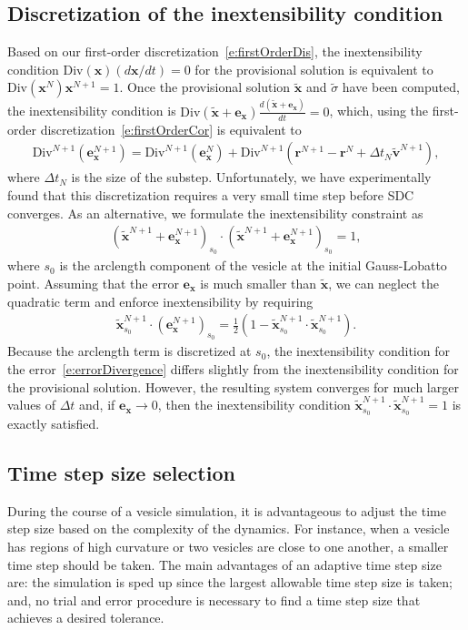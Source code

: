 \documentclass[3p,times,procedia]{elsarticle}
\newcommand{\rr}{{\mathbf{r}}}
\newcommand{\vv}{{\mathbf{v}}}
\newcommand{\xx}{{\mathbf{x}}}
\newcommand{\exx}{\mathbf{e}_{\xx}}
\newcommand{\tsigma}{{\tilde{\sigma}}}
\newcommand{\tvv}{{\tilde{\vv}}}
\newcommand{\txx}{{\tilde{\xx}}}
\newcommand{\Div}{{\mathrm{Div}}}
\begin{document}
\subsection{Discretization of the inextensibility condition}
Based on our first-order discretization~\eqref{e:firstOrderDis}, the
inextensibility condition $\Div(\xx)(d\xx/dt) = 0$ for the provisional
solution is equivalent to $\Div(\xx^{N}) \xx^{N+1} = 1$.  Once the
provisional solution $\txx$ and $\tsigma$ have been computed, the
inextensibility condition is $\Div(\txx+\exx)\frac{d(\txx+\exx)}{dt} =
0$, which, using the first-order discretization~\eqref{e:firstOrderCor}
is equivalent to
\begin{align*}
  \Div^{N+1} (\exx^{N+1}) = \Div^{N+1} (\exx^{N}) + 
  \Div^{N+1} (\rr^{N+1} - \rr^{N} + \Delta t_{N} \tvv^{N+1}),
\end{align*}
where $\Delta t_{N}$ is the size of the substep.  Unfortunately, we
have experimentally found that this discretization requires a very
small time step before SDC converges.  As an alternative, we formulate
the inextensibility constraint as
\begin{align*}
  (\txx^{N+1} + \exx^{N+1})_{s_{0}} \cdot 
  (\txx^{N+1} + \exx^{N+1})_{s_{0}}  = 1,
\end{align*}
where $s_{0}$ is the arclength component of the vesicle at the initial
Gauss-Lobatto point.  Assuming that the error $\exx$ is much smaller
than $\txx$, we can neglect the quadratic term and enforce
inextensibility by requiring
\begin{align}
  \txx^{N+1}_{s_{0}} \cdot (\exx^{N+1})_{s_{0}} = \frac{1}{2}
    (1 - \txx_{s_{0}}^{N+1} \cdot \txx_{s_{0}}^{N+1}).
  \label{e:errorDivergence}
\end{align}
Because the arclength term is discretized at $s_{0}$, the
inextensibility condition for the error~\eqref{e:errorDivergence}
differs slightly from the inextensibility condition for the provisional
solution.  However, the resulting system converges for much larger
values of $\Delta t$ and, if $\exx \rightarrow 0$, then the
inextensibility condition $\txx^{N+1}_{s_{0}} \cdot \txx^{N+1}_{s_{0}} =
1$ is exactly satisfied.

\subsection{Time step size selection}
During the course of a vesicle simulation, it is advantageous to adjust
the time step size based on the complexity of the dynamics.  For
instance, when a vesicle has regions of high curvature or two vesicles
are close to one another, a smaller time step should be taken.  The main
advantages of an adaptive time step size are: the simulation is sped up
since the largest allowable time step size is taken; and, no trial and
error procedure is necessary to find a time step size that achieves a
desired tolerance.
\end{document}

